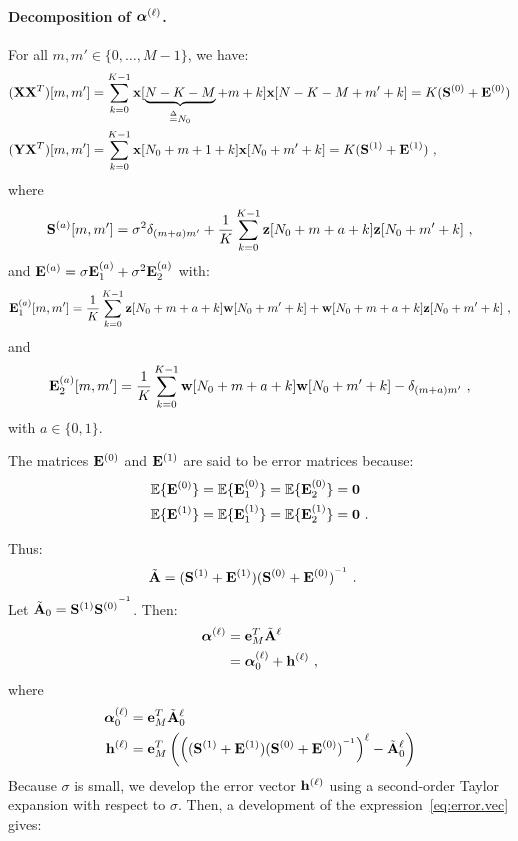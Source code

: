 \paragraph{Decomposition of $\boldsymbol{\alpha}^{(\ell)}$.}
For all $m,m'\in\{0,\ldots,M-1\}$, we have:
\begin{align}
({\mathbf X}{\mathbf X}^T)[m,m'] &= \sum_{k=0}^{K-1} {\mathbf x}[\underbrace{N-K-M}_{\overset{\Delta}{=} N_0}+m+k]{\mathbf x}[N-K-M+m'+k] = K({\mathbf S}^{(0)} + {\mathbf E}^{(0)}) \\
({\mathbf Y}{\mathbf X}^T)[m,m'] &= \sum_{k=0}^{K-1} {\mathbf x}[N_0+m+1+k]{\mathbf x}[N_0+m'+k] = K({\mathbf S}^{(1)} + {\mathbf E}^{(1)})\ ,
\end{align}
where
\[
{\mathbf S}^{(a)}[m,m'] = \sigma^2\delta_{(m+a)m'}+\dfrac1{K}\sum_{k=0}^{K-1} {\mathbf z}[N_0+m+a+k]{\mathbf z}[N_0+m'+k] \ ,
\]
and ${\mathbf E}^{(a)} = \sigma{\mathbf E}_1^{(a)} + \sigma^2{\mathbf E}_2^{(a)}$ with:
\[
{\mathbf E}_1^{(a)}[m,m'] = \dfrac1K\sum_{k=0}^{K-1} {\mathbf z}[N_0+m+a+k]{\mathbf w}[N_0+m'+k] + {\mathbf w}[N_0+m+a+k]{\mathbf z}[N_0+m'+k]\ ,
\]
and
\[
{\mathbf E}_2^{(a)}[m,m'] =  \dfrac1K\sum_{k=0}^{K-1} {\mathbf w}[N_0+m+a+k]{\mathbf w}[N_0+m'+k] - \delta_{(m+a)m'}\ ,
\]
with $a\in\{0,1\}$.
\begin{remark}
The matrices ${\mathbf E}^{(0)}$ and ${\mathbf E}^{(1)}$ are said to be error matrices because:
\begin{align*}
{\mathbb E}\{{\mathbf E}^{(0)}\} &= {\mathbb E}\{{\mathbf E}_1^{(0)}\} = {\mathbb E}\{{\mathbf E}_2^{(0)}\} = \boldsymbol{0} \\
{\mathbb E}\{{\mathbf E}^{(1)}\} &= {\mathbb E}\{{\mathbf E}_1^{(1)}\} = {\mathbb E}\{{\mathbf E}_2^{(1)}\} = \boldsymbol{0}\ .
\end{align*}
\end{remark}
Thus:
\begin{align*}
\tilde{{\mathbf A}} &= ({\mathbf S}^{(1)}+{\mathbf E}^{(1)})({\mathbf S}^{(0)}+{\mathbf E}^{(0)})^{^{-1}}\ .
\end{align*}
Let $\tilde{{\mathbf A}}_0={\mathbf S}^{(1)}{{\mathbf S}^{(0)}}^{^{-1}}$. Then:
\begin{align*}
\boldsymbol{\alpha}^{(\ell)} &= {\mathbf e}_M^T\tilde{{\mathbf A}}^\ell \\
&= \boldsymbol{\alpha}^{(\ell)}_0 + {\mathbf h}^{(\ell)}\ ,
\end{align*}
where
\begin{align}
\nonumber
\boldsymbol{\alpha}^{(\ell)}_0 &= {\mathbf e}_M^T\tilde{{\mathbf A}}_0^\ell \\
{\mathbf h}^{(\ell)} &= {\mathbf e}_M^T\left(\left(({\mathbf S}^{(1)}+{\mathbf E}^{(1)})({\mathbf S}^{(0)}+{\mathbf E}^{(0)})^{^{-1}}\right)^\ell- \tilde{{\mathbf A}}_0^\ell\right)
\label{eq:error.vec}
\end{align}
Because $\sigma$ is small, we develop the error vector ${\mathbf h}^{(\ell)}$ using a second-order Taylor expansion with respect to $\sigma$. Then, a development  of the expression~\eqref{eq:error.vec} gives:

